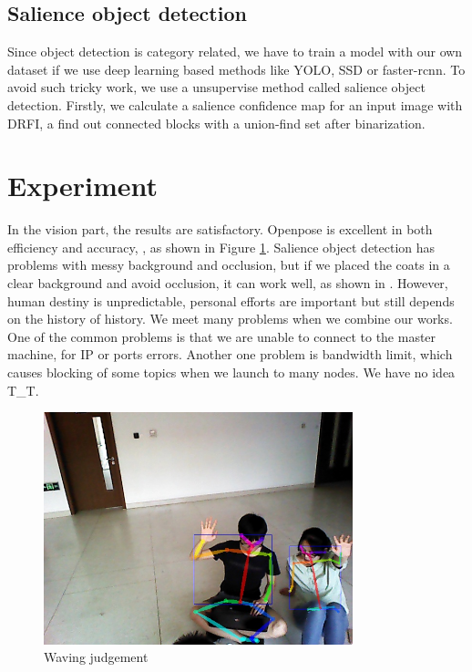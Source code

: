 \documentclass[UTF8]{article}
\begin{document}
  \subsection{Salience object detection}
    Since object detection is category related, we have to train a model with our own dataset if we use deep learning based methods like YOLO, SSD or faster-rcnn. To avoid such tricky work, we use a unsupervise method called salience object detection. Firstly, we calculate a salience confidence map for an input image with DRFI, a find out connected blocks with a union-find set after binarization.


\section{Experiment}
  In the vision part, the results are satisfactory. Openpose is excellent in both efficiency and accuracy, , as shown in Figure \ref{img_2}. Salience object detection has problems with messy background and occlusion, but if we placed the coats in a clear background and avoid occlusion, it can work well, as shown in .%
  However, human destiny is unpredictable, personal efforts are important but still depends on the history of history. We meet many problems when we combine our works. One of the common problems is that we are unable to connect to the master machine, for IP or ports errors. Another one problem is bandwidth limit, which causes blocking of some topics when we launch to many nodes. We have no idea T\_T.

  \begin{figure}
    \centering
    \includegraphics[width=0.8\textwidth]{wj.jpg}
    \caption{Waving judgement}
    \label{img_2}
  \end{figure}
\end{document}
